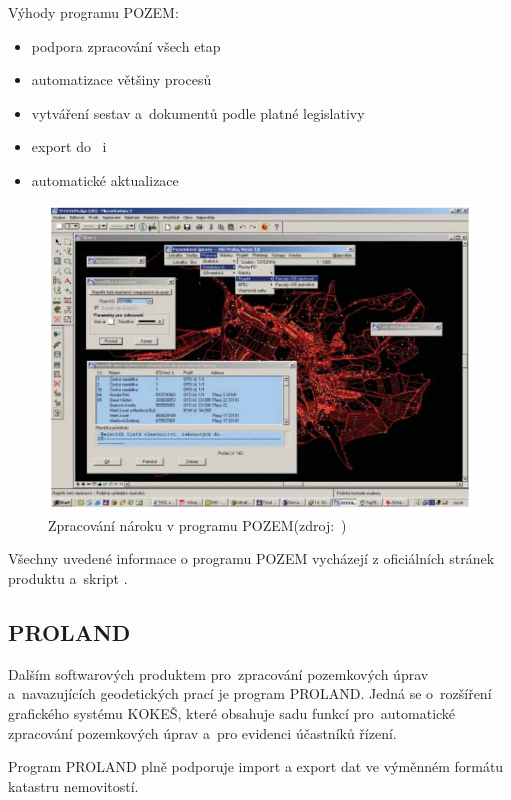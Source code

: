 Výhody programu POZEM:
	\begin{itemize}[leftmargin=1.5cm, noitemsep]
		\item podpora zpracování všech etap 
		\item automatizace většiny procesů 
		\item vytváření sestav a~dokumentů podle platné legislativy
		\item export do~ i~
		\item automatické aktualizace
	\end{itemize}

	\begin{figure}[H]
		\centering
		\includegraphics[width=.8\textwidth]{./pictures/pozem.png}
		\caption[Zpracování nároku v programu POZEM]{Zpracování nároku v programu POZEM(zdroj:~\cite{pozem})}
		\label{fig:pozem_obrazek}
 	\end{figure}


Všechny uvedené informace o programu POZEM vycházejí z oficiálních stránek produktu \citep{pozem} a~skript \citep{pu_skripta}.

\subsection{PROLAND}
\label{proland}

Dalším softwarových produktem pro~zpracování pozemkových úprav a~navazujících geodetických prací je program PROLAND. Jedná se o~rozšíření grafického systému KOKEŠ, které obsahuje sadu funkcí pro~automatické zpracování pozemkových úprav a~pro evidenci účastníků řízení.

Program PROLAND plně podporuje import a export dat ve výměnném formátu katastru nemovitostí.

